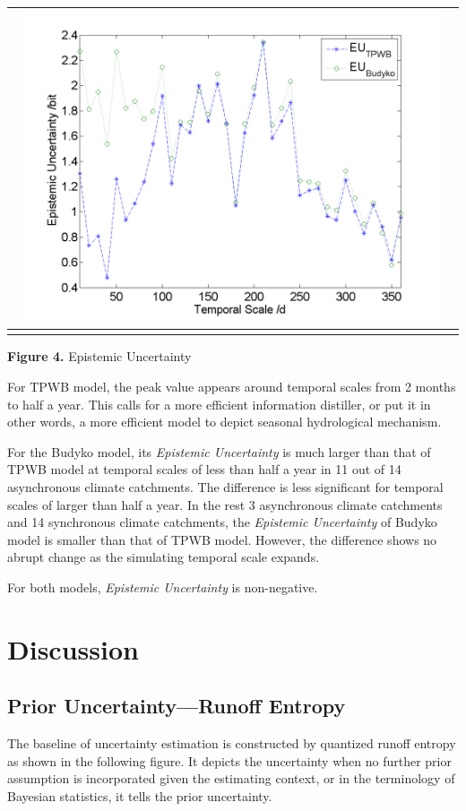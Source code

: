 \documentclass[draft,wrr]{AGUTeX}
\begin{document}
\begin{article}
\begin{table}[H]
{\begin{tabular}{ccc}
&\begin{minipage}{.6\textwidth}\includegraphics[width=\linewidth]{resultgraph/11532500EU.png}\end{minipage}
\\
\hline
\\
\end{tabular}
}
\Large{\textbf{Figure 4.} Epistemic Uncertainty }
\end{table} 
For TPWB model, the peak value appears around temporal scales from 2 months to half a year. This calls for a more efficient information distiller, or put it in other words, a more efficient model to depict seasonal hydrological mechanism.  

For the Budyko model, its \emph{Epistemic Uncertainty} is much larger than that of TPWB model at temporal scales of less than half a year in 11 out of 14 asynchronous climate catchments. The difference is less significant for temporal scales of larger than half a year. In the rest 3 asynchronous climate catchments and 14 synchronous climate catchments, the \emph{Epistemic Uncertainty} of Budyko model is smaller than that of TPWB model. However, the difference shows no abrupt change as the simulating temporal scale expands. 




For both models,  \emph{Epistemic Uncertainty} is non-negative.

\section{Discussion}
\subsection{Prior Uncertainty---Runoff Entropy}
The baseline of uncertainty estimation is constructed by  quantized runoff entropy as shown in the following figure. It depicts the uncertainty when no further prior assumption is incorporated given the estimating context, or in the terminology of Bayesian statistics, it tells the prior uncertainty.


\end{article}
\end{document}
